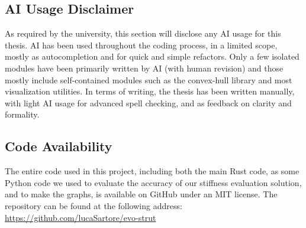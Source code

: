 \subsection*{AI Usage Disclaimer}

As required by the university, this section will disclose any AI usage for this thesis.
AI has been used throughout the coding process, in a limited scope, mostly as autocompletion
and for quick and simple refactors.
Only a few isolated modules have been primarily written by AI (with human revision)
and those mostly include self-contained modules such as the convex-hull 
library and most visualization utilities.
In terms of writing, the thesis has been written manually, with light AI usage 
for advanced spell checking, and as feedback on clarity and formality.

\subsection*{Code Availability}

The entire code used in this project, including both the main Rust code, 
as some Python code we used to evaluate the accuracy of our stiffness evaluation solution,
and to make the graphs, is available on GitHub under an MIT license.
The repository can be found at the following address: \url{https://github.com/lucaSartore/evo-strut}
